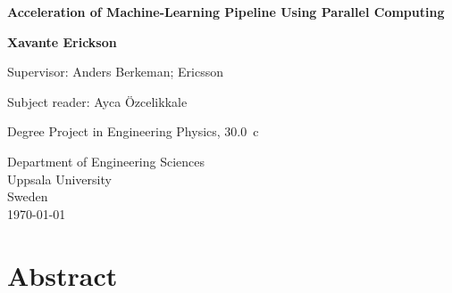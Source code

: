 \documentclass[12pt, a4paper]{article}
\title{}
\author{Lowe Erickson }
\date{May 2018}
\begin{document}
\begin{titlepage}
   \begin{center}
        \vspace*{1cm}
        \Huge
        \textbf{Acceleration of
        Machine-Learning Pipeline Using Parallel Computing}
 
        \LARGE
        \vspace{1cm}
       
        \textbf{Xavante Erickson}
 
        \vfill
        
        Supervisor: Anders Berkeman; Ericsson

        \vspace{0.5cm}
        
        Subject reader: Ayca Özcelikkale
        
        \vspace{0.5cm}

        Degree Project in Engineering Physics, \SI{30.0}{c}
 
        \vspace{0.8cm}
 
 
        Department of Engineering Sciences\\
        \vspace{0.2cm}
        Uppsala University\\
        \vspace{0.2cm}
        Sweden\\
        \vspace{0.2cm}
        \today
   \end{center}
\end{titlepage}



\section*{Abstract}
\end{document}
